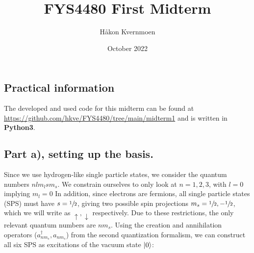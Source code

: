 \documentclass{article}
\title{FYS4480 First Midterm}
\author{Håkon Kvernmoen}
\date{October 2022}
\newcommand{\vac}{\ket{0}}
\newcommand{\crt}[1]{a_{#1}^{\dagger}}
\newcommand{\ani}[1]{a_{#1}}
\begin{document}
\maketitle

\subsection*{Practical information}
    The developed and used code for this midterm can be found at \url{https://github.com/hkve/FYS4480/tree/main/midterm1} and is written in \textbf{Python3}.

\subsection*{Part a), setting up the basis.}
    Since we use hydrogen-like single particle states, we consider the quantum numbers $nlm_l sm_s$. We constrain ourselves to only look at $n = 1,2,3$, with $l = 0$ implying $m_l = 0$ In addition, since electrons are fermions, all single particle states (SPS) must have $s = \sfrac{1}{2}$, giving two possible spin projections $m_s = \sfrac{1}{2}, -\sfrac{1}{2}$, which we will write as $\uparrow, \downarrow$ respectively. Due to these restrictions, the only relevant quantum numbers are $nm_s$. Using the creation and annihilation operators ($\crt{nm_s}, \ani{nm_s}$) from the second quantization formalism, we can construct all six SPS as excitations of the vacuum state $\vac$:
    
\end{document}
